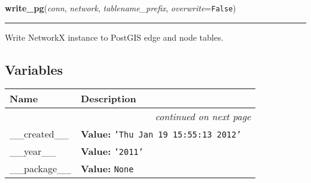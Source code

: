     \label{nx_pg:write_pg}

    \vspace{0.5ex}

\hspace{.8\funcindent}\begin{boxedminipage}{\funcwidth}

    \raggedright \textbf{write\_pg}(\textit{conn}, \textit{network}, \textit{tablename\_prefix}, \textit{overwrite}={\tt False})

    \vspace{-1.5ex}

    \rule{\textwidth}{0.5\fboxrule}
\setlength{\parskip}{2ex}
    Write NetworkX instance to PostGIS edge and node tables.

\setlength{\parskip}{1ex}
    \end{boxedminipage}



  \subsection{Variables}

    \vspace{-1cm}
\hspace{\varindent}\begin{longtable}{|p{\varnamewidth}|p{\vardescrwidth}|l}
\cline{1-2}
\cline{1-2} \centering \textbf{Name} & \centering \textbf{Description}& \\
\cline{1-2}
\endhead\cline{1-2}\multicolumn{3}{r}{\small\textit{continued on next page}}\\\endfoot\cline{1-2}
\endlastfoot\raggedright \_\-\_\-c\-r\-e\-a\-t\-e\-d\-\_\-\_\- & \raggedright \textbf{Value:} 
{\tt \texttt{'}\texttt{Thu Jan 19 15:55:13 2012}\texttt{'}}&\\
\cline{1-2}
\raggedright \_\-\_\-y\-e\-a\-r\-\_\-\_\- & \raggedright \textbf{Value:} 
{\tt \texttt{'}\texttt{2011}\texttt{'}}&\\
\cline{1-2}
\raggedright \_\-\_\-p\-a\-c\-k\-a\-g\-e\-\_\-\_\- & \raggedright \textbf{Value:} 
{\tt None}&\\
\cline{1-2}
\end{longtable}

